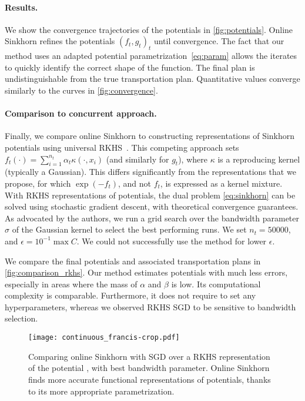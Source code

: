 \paragraph{Results.} We show the convergence trajectories of the potentials in
\autoref{fig:potentials}. Online Sinkhorn refines the potentials $(f_t, g_t)_t$ until convergence. The fact that our method uses an adapted potential parametrization~\eqref{eq:param}
allows the iterates to quickly identify the correct shape of the function. The final
plan is undistinguishable from the true transportation plan. Quantitative values
converge similarly to the curves in \autoref{fig:convergence}.

\paragraph{Comparison to concurrent approach.} Finally, we compare online
Sinkhorn to constructing representations of Sinkhorn potentials using universal
RKHS~\cite{2016-genevay-nips}. This competing approach sets $f_t(\cdot) =
\sum_{i=1}^{n_t} \alpha_t \kappa(\cdot, x_i)$ (and similarly for $g_t$), where $\kappa$ is
a reproducing kernel (typically a Gaussian). This differs significantly from the
representations that we propose, for which $\exp(-f_t)$, and not $f_t$, is
expressed as a kernel mixture. 
%
With RKHS representations of potentials, the
dual problem \eqref{eq:sinkhorn} can be solved using stochastic gradient
descent, with theoretical convergence guarantees. As advocated by the authors,
we run a grid search over the bandwidth parameter $\sigma$ of the Gaussian kernel to select the best
performing runs. We set $n_t = 50000$, and $\epsilon = 10^{-1} \max C$. We could not successfully use the method for lower $\epsilon$.

We compare the final potentials and associated
transportation plans in \autoref{fig:comparison_rkhs}. Our method estimates
potentials with much less errors, especially in areas where the mass of $\alpha$
and $\beta$ is low. Its computational complexity is comparable. Furthermore, it
does not require to set any hyperparameters, whereas we observed RKHS SGD to be
 sensitive to bandwidth selection.

\begin{figure}[t]
    \centering
    \texttt{[image: continuous\_francis-crop.pdf]}
    \caption{Comparing online Sinkhorn with SGD over a RKHS representation of the potential \citep{2016-genevay-nips}, with best bandwidth parameter. Online Sinkhorn finds more accurate functional representations of potentials, thanks to its more appropriate parametrization.}
    \label{fig:comparison_rkhs}
\end{figure}